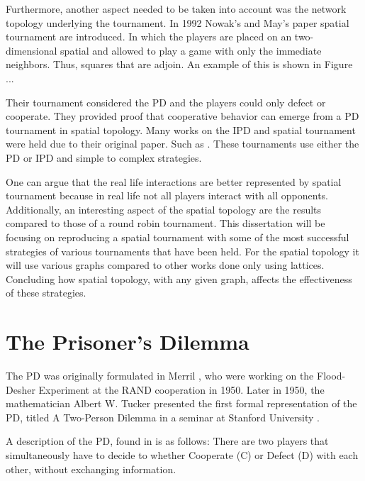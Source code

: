 Furthermore, another aspect needed to be taken into account was the network
topology underlying the tournament. In 1992 Nowak's and May's paper \cite{Nowak1992}
spatial tournament are introduced. In which the players are placed on an two-
dimensional spatial and allowed to play a game with only the immediate neighbors.
Thus, squares that are adjoin. An example of this is shown in Figure ...


Their tournament considered the PD and the players could only defect or
cooperate.  They provided proof that cooperative behavior can emerge from a PD
tournament in spatial topology. Many works on the IPD and spatial tournament
were held due to their original paper. Such as \cite{Grujic2014, Nowak1993,
Maciver1992, Nowak1992, Brauchli1999, Meng2015, Lindgren1994}.
These tournaments use either the PD or IPD and simple to complex strategies.

One can argue that the real life interactions are better represented by spatial
tournament because in real life not all players interact with all opponents.
Additionally, an interesting aspect of the spatial topology are the results
compared to those of a round robin tournament. This dissertation will be focusing on
reproducing a spatial tournament with some of the most successful strategies of
various tournaments that have been held. For the spatial topology it will use
various graphs compared to other works done only using lattices. Concluding how
spatial topology, with any given graph, affects the effectiveness of these
strategies.

\section{The Prisoner's Dilemma}

The PD was originally formulated in Merril \cite{M. Flood and Melvin Dresher},
who were working on the Flood-Desher Experiment at the RAND cooperation in 1950.
Later in 1950, the mathematician Albert W. Tucker presented the first formal
representation of the PD, titled  A Two-Person Dilemma in a seminar at
Stanford University \cite{GassAssad2005}.

A description of the PD, found in \cite{Li2011} is as follows:
There are two players that simultaneously have to decide to whether Cooperate (C)
or Defect (D) with each other, without exchanging information.

